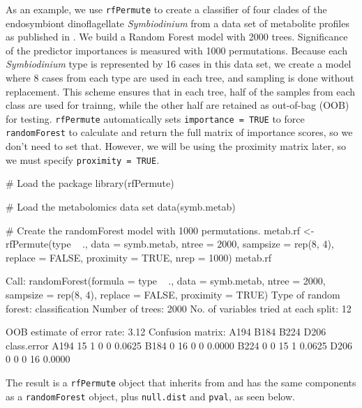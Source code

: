 As an example, we use \texttt{rfPermute} to create a classifier of four
clades of the endosymbiont dinoflagellate \emph{Symbiodinium} from a
data set of metabolite profiles as published in \citet{RN404}. We build
a Random Forest model with 2000 trees. Significance of the predictor
importances is measured with 1000 permutations. Because each
\emph{Symbiodinium} type is represented by 16 cases in this data set, we
create a model where 8 cases from each type are used in each tree, and
sampling is done without replacement. This scheme ensures that in each
tree, half of the samples from each class are used for trainng, while
the other half are retained as out-of-bag (OOB) for testing.
\texttt{rfPermute} automatically sets \texttt{importance\ =\ TRUE} to
force \texttt{randomForest} to calculate and return the full matrix of
importance scores, so we don't need to set that. However, we will be
using the proximity matrix later, so we must specify
\texttt{proximity\ =\ TRUE}.

\begin{Schunk}
\begin{Sinput}
# Load the package
library(rfPermute)
\end{Sinput}
\end{Schunk}\begin{Schunk}
\begin{Sinput}
# Load the metabolomics data set
data(symb.metab)

# Create the randomForest model with 1000 permutations.
metab.rf <- rfPermute(type ~ ., data = symb.metab, ntree = 2000, sampsize = rep(8, 
    4), replace = FALSE, proximity = TRUE, nrep = 1000)
metab.rf
\end{Sinput}
\begin{Soutput}

Call:
 randomForest(formula = type ~ ., data = symb.metab, ntree = 2000,      sampsize = rep(8, 4), 
 replace = FALSE, proximity = TRUE) 
               Type of random forest: classification
                     Number of trees: 2000
No. of variables tried at each split: 12

        OOB estimate of  error rate: 3.12%
Confusion matrix:
     A194 B184 B224 D206 class.error
A194   15    1    0    0      0.0625
B184    0   16    0    0      0.0000
B224    0    0   15    1      0.0625
D206    0    0    0   16      0.0000
\end{Soutput}
\end{Schunk}

The result is a \texttt{rfPermute} object that inherits from and has the
same components as a \texttt{randomForest} object, plus
\texttt{null.dist} and \texttt{pval}, as seen below.

